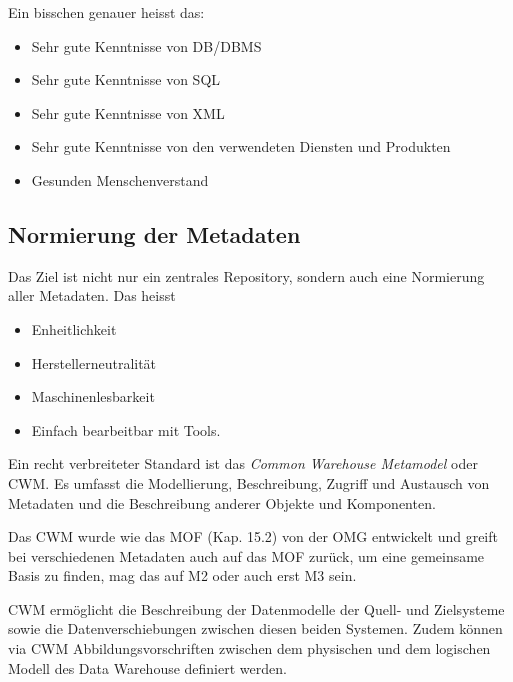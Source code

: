 \documentclass[a4paper, 11pt, nofootinbib]{article}
\begin{document}
Ein bisschen genauer heisst das:

\begin{multicols}{2}
	\begin{itemize}
		\item Sehr gute Kenntnisse von DB/DBMS
		\item Sehr gute Kenntnisse von SQL
		\item Sehr gute Kenntnisse von XML
		\item Sehr gute Kenntnisse von den verwendeten Diensten und Produkten
		\item Gesunden Menschenverstand
	\end{itemize}
\end{multicols}

\subsection{Normierung der Metadaten}
Das Ziel ist nicht nur ein zentrales Repository, sondern auch eine Normierung aller Metadaten. Das heisst

\begin{multicols}{2}
	\begin{itemize}
		\item Enheitlichkeit
		\item Herstellerneutralität
		\item Maschinenlesbarkeit
		\item Einfach bearbeitbar mit Tools.
	\end{itemize}
\end{multicols}

\noindent Ein recht verbreiteter Standard ist das \textit{Common Warehouse Metamodel} oder CWM. Es umfasst die Modellierung, Beschreibung, Zugriff und Austausch von Metadaten und die Beschreibung anderer Objekte und Komponenten.

Das CWM wurde wie das MOF (Kap. 15.2) von der OMG entwickelt und greift bei verschiedenen Metadaten auch auf das MOF zurück, um eine gemeinsame Basis zu finden, mag das auf M2 oder auch erst M3 sein.

CWM ermöglicht die Beschreibung der Datenmodelle der Quell- und Zielsysteme sowie die Datenverschiebungen zwischen diesen beiden Systemen. Zudem können via CWM Abbildungsvorschriften zwischen dem physischen und dem logischen Modell des Data Warehouse definiert werden.
\vspace{10px}
\end{document}
